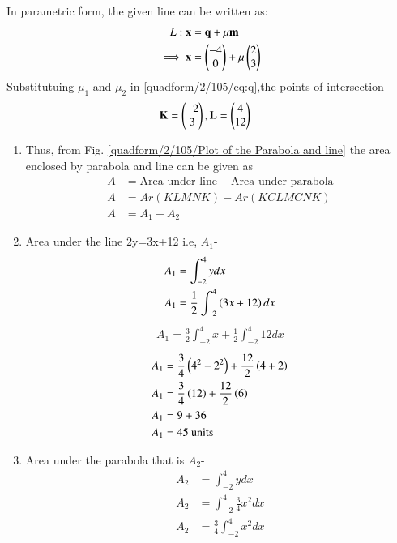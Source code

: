  In parametric form, the given  line can be written as:
\begin{align} 
L: \mathbf{x}&=\mathbf{q}+\mu\mathbf{m}
\\
\implies \mathbf{x}&=\begin{pmatrix}-4\\0\end{pmatrix}+\mu\begin{pmatrix}2\\3\end{pmatrix} \label{quadform/2/105/eq:q}
\end{align}
Substitutuing $\mu_1$ and $\mu_2$ in \eqref{quadform/2/105/eq:q},the points of intersection
\begin{align}
 \mathbf{K}= \begin{pmatrix}-2\\3\end{pmatrix},  
\mathbf{L}&= \begin{pmatrix}4\\12\end{pmatrix}
\end{align}

\begin{enumerate}
  \item Thus, from Fig. \ref{quadform/2/105/Plot of the Parabola and line} the area enclosed by parabola and line can be given as
\begin{align}
   A&= \text{Area under line} - \text{Area under parabola}
     \\
   A&= Ar(KLMNK)-Ar(KCLMCNK)
    \\
    A&= A_1 -A_2 \label{quadform/2/105/eqAREA}
    \end{align}
\item Area under the line 2y=3x+12 i.e, $A_1$-
\begin{align}
  A_1&= \int_{-2}^{4} y dx
    \\
    A_1&= \frac{1}{2}\int_{-2}^{4} \left(3x+12\right) dx
    \end{align}
    \begin{align}
    A_1= \frac{3}{2}\int_{-2}^{4} x+\frac{1}{2}\int_{-2}^{4}12 dx
    \end{align}
    \begin{align}
    A_1&= \frac{3}{4}\left(4^2-2^2\right) +\frac{12}{2}\left(4+2\right)
   \\
    A_1&= \frac{3}{4}\left(12\right) +\frac{12}{2}\left(6\right)
    \\
    A_1&= 9 +36
    \\
    A_1 &=45 \text{ units} \label{quadform/2/105/eqB}
\end{align}
\item Area under the parabola that is $A_2$-
\begin{align}
    A_2&= \int_{-2}^{4} y dx
    \\
    A_2&= \int_{-2}^{4} \frac{3}{4} x^2 dx
    \\
    A_2&= \frac{3}{4} \int_{-2}^{4}  x^2 dx

\end{align}
\end{enumerate}
